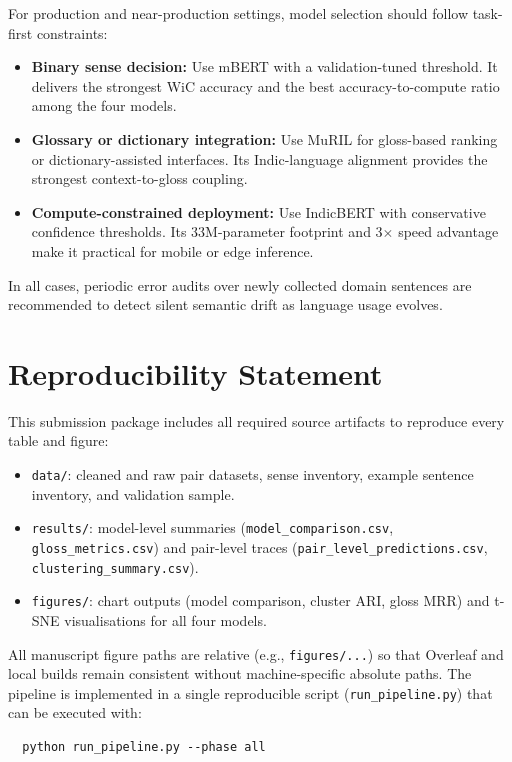 \documentclass{ieeeaccess}
\begin{document}
For production and near-production settings, model selection should follow
task-first constraints:
\begin{itemize}
  \item \textbf{Binary sense decision:} Use mBERT with a validation-tuned
        threshold.
        It delivers the strongest WiC accuracy and the best
        accuracy-to-compute ratio among the four models.
  \item \textbf{Glossary or dictionary integration:} Use MuRIL for gloss-based
        ranking or dictionary-assisted interfaces.
        Its Indic-language alignment provides the strongest context-to-gloss
        coupling.
  \item \textbf{Compute-constrained deployment:} Use IndicBERT with conservative
        confidence thresholds.
        Its 33M-parameter footprint and 3$\times$ speed advantage make it
        practical for mobile or edge inference.
\end{itemize}

In all cases, periodic error audits over newly collected domain sentences are
recommended to detect silent semantic drift as language usage evolves.

\section{Reproducibility Statement}
\label{sec:repro}

This submission package includes all required source artifacts to reproduce
every table and figure:
\begin{itemize}
  \item \texttt{data/}: cleaned and raw pair datasets, sense inventory, example
        sentence inventory, and validation sample.
  \item \texttt{results/}: model-level summaries (\texttt{model\_comparison.csv},
        \texttt{gloss\_metrics.csv}) and pair-level traces
        (\texttt{pair\_level\_predictions.csv},
        \texttt{clustering\_summary.csv}).
  \item \texttt{figures/}: chart outputs (model comparison, cluster ARI, gloss
        MRR) and t-SNE visualisations for all four models.
\end{itemize}

All manuscript figure paths are relative (e.g., \texttt{figures/...}) so that
Overleaf and local builds remain consistent without machine-specific
absolute paths.
The pipeline is implemented in a single reproducible script
(\texttt{run\_pipeline.py}) that can be executed with:
\begin{verbatim}
  python run_pipeline.py --phase all
\end{verbatim}
\end{document}
